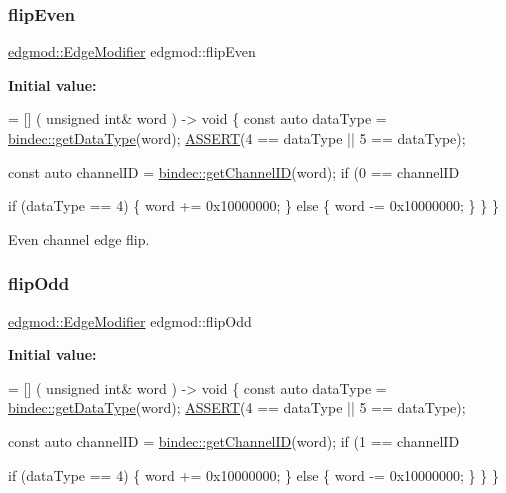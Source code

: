 \subsubsection{\texorpdfstring{flip\+Even}{flipEven}}
{\footnotesize\ttfamily \hyperlink{namespaceedgmod_abd975beb42f73310619eb134f62d7712}{edgmod\+::\+Edge\+Modifier} edgmod\+::flip\+Even}

{\bfseries Initial value\+:}
\begin{DoxyCode}
= [] (
    \textcolor{keywordtype}{unsigned} \textcolor{keywordtype}{int}& word
) -> \textcolor{keywordtype}{void} \{
    \textcolor{keyword}{const} \textcolor{keyword}{auto} dataType = \hyperlink{namespacebindec_a7a98adfd04c65f870f74a423bfd744fe}{bindec::getDataType}(word);
    \hyperlink{_debug_8hpp_aca68c0d4ac8df0838e209fb5300f7be3}{ASSERT}(4 == dataType || 5 == dataType);

    
    \textcolor{keyword}{const} \textcolor{keyword}{auto} channelID = \hyperlink{namespacebindec_af1997af0743251d010780a8f728fcd7e}{bindec::getChannelID}(word);
    \textcolor{keywordflow}{if} (0 == channelID%
        
        \textcolor{keywordflow}{if} (dataType == 4) \{
            word += 0x10000000;
        \} \textcolor{keywordflow}{else} \{
            word -= 0x10000000;
        \}
    \}
\}
\end{DoxyCode}


Even channel edge flip. 

\mbox{\label{namespaceedgmod_abedd27017e7b73a6aaf3aae39d324eb6}} 
\subsubsection{\texorpdfstring{flip\+Odd}{flipOdd}}
{\footnotesize\ttfamily \hyperlink{namespaceedgmod_abd975beb42f73310619eb134f62d7712}{edgmod\+::\+Edge\+Modifier} edgmod\+::flip\+Odd}

{\bfseries Initial value\+:}
\begin{DoxyCode}
= [] (
    \textcolor{keywordtype}{unsigned} \textcolor{keywordtype}{int}& word
) -> \textcolor{keywordtype}{void} \{
    \textcolor{keyword}{const} \textcolor{keyword}{auto} dataType = \hyperlink{namespacebindec_a7a98adfd04c65f870f74a423bfd744fe}{bindec::getDataType}(word);
    \hyperlink{_debug_8hpp_aca68c0d4ac8df0838e209fb5300f7be3}{ASSERT}(4 == dataType || 5 == dataType);

    
    \textcolor{keyword}{const} \textcolor{keyword}{auto} channelID = \hyperlink{namespacebindec_af1997af0743251d010780a8f728fcd7e}{bindec::getChannelID}(word);
    \textcolor{keywordflow}{if} (1 == channelID%
        
        \textcolor{keywordflow}{if} (dataType == 4) \{
            word += 0x10000000;
        \} \textcolor{keywordflow}{else} \{
            word -= 0x10000000;
        \}
    \}
\}
\end{DoxyCode}


